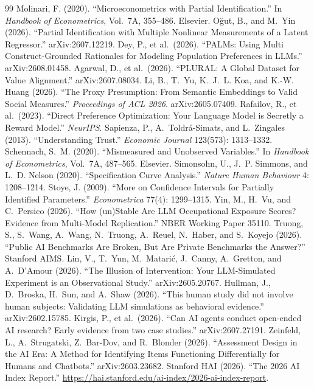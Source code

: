 \documentclass[10pt,letterpaper]{article}
\begin{document}
\begin{thebibliography}{99}
 Molinari, F. (2020). ``Microeconometrics with Partial Identification.'' In \textit{Handbook of Econometrics}, Vol.~7A, 355--486. Elsevier.
 O\u{g}ut, B., and M.~Yin (2026). ``Partial Identification with Multiple Nonlinear Measurements of a Latent Regressor.'' arXiv:2607.12219.
 Dey, P., et al.\ (2026). ``PALMs: Using Multi Construct-Grounded Rationales for Modeling Population Preferences in LLMs.'' arXiv:2608.01458.
 Agarwal, D., et al.\ (2026). ``PLURAL: A Global Dataset for Value Alignment.'' arXiv:2607.08034.
 Li, B., T.~Yu, K.~J.~L. Koa, and K.-W. Huang (2026). ``The Proxy Presumption: From Semantic Embeddings to Valid Social Measures.'' \textit{Proceedings of ACL 2026}. arXiv:2605.07409.
 Rafailov, R., et al.\ (2023). ``Direct Preference Optimization: Your Language Model is Secretly a Reward Model.'' \textit{NeurIPS}.
 Sapienza, P., A.~Toldr\'a-Simats, and L.~Zingales (2013). ``Understanding Trust.'' \textit{Economic Journal} 123(573): 1313--1332.
 Schennach, S.~M. (2020). ``Mismeasured and Unobserved Variables.'' In \textit{Handbook of Econometrics}, Vol.~7A, 487--565. Elsevier.
 Simonsohn, U., J.~P. Simmons, and L.~D. Nelson (2020). ``Specification Curve Analysis.'' \textit{Nature Human Behaviour} 4: 1208--1214.
 Stoye, J. (2009). ``More on Confidence Intervals for Partially Identified Parameters.'' \textit{Econometrica} 77(4): 1299--1315.
 Yin, M., H.~Vu, and C.~Persico (2026). ``How (un)Stable Are LLM Occupational Exposure Scores? Evidence from Multi-Model Replication.'' NBER Working Paper 35110.
 Truong, S., S.~Wang, A.~Wang, N.~Truong, A.~Reuel, N.~Haber, and S.~Koyejo (2026). ``Public AI Benchmarks Are Broken, But Are Private Benchmarks the Answer?'' Stanford AIMS.
 Lin, V., T.~Yun, M.~Matari\'c, J.~Canny, A.~Gretton, and A.~D'Amour (2026). ``The Illusion of Intervention: Your LLM-Simulated Experiment is an Observational Study.'' arXiv:2605.20767.
 Hullman, J., D.~Broska, H.~Sun, and A.~Shaw (2026). ``This human study did not involve human subjects: Validating LLM simulations as behavioral evidence.'' arXiv:2602.15785.
 Kirgis, P., et al.\ (2026). ``Can AI agents conduct open-ended AI research? Early evidence from two case studies.'' arXiv:2607.27191.
 Zeinfeld, L., A.~Strugatski, Z.~Bar-Dov, and R.~Blonder (2026). ``Assessment Design in the AI Era: A Method for Identifying Items Functioning Differentially for Humans and Chatbots.'' arXiv:2603.23682.
 Stanford HAI (2026). ``The 2026 AI Index Report.'' \url{https://hai.stanford.edu/ai-index/2026-ai-index-report}.
\end{thebibliography}
\end{document}
